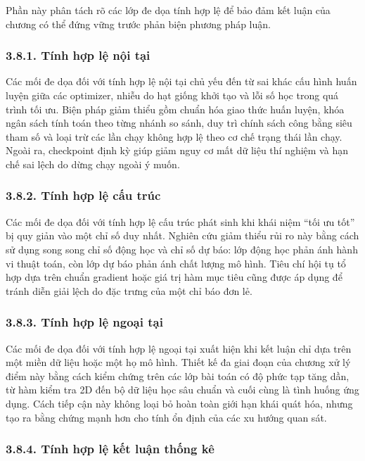 \documentclass[a4paper,12pt]{article}
\begin{document}
Phần này phân tách rõ các lớp đe dọa tính hợp lệ để bảo đảm kết luận của chương có thể đứng vững trước phản biện phương pháp luận.

\subsubsection{3.8.1. Tính hợp lệ nội tại}

Các mối đe dọa đối với tính hợp lệ nội tại chủ yếu đến từ sai khác cấu hình huấn luyện giữa các optimizer, nhiễu do hạt giống khởi tạo và lỗi số học trong quá trình tối ưu. Biện pháp giảm thiểu gồm chuẩn hóa giao thức huấn luyện, khóa ngân sách tính toán theo từng nhánh so sánh, duy trì chính sách công bằng siêu tham số và loại trừ các lần chạy không hợp lệ theo cơ chế trạng thái lần chạy. Ngoài ra, checkpoint định kỳ giúp giảm nguy cơ mất dữ liệu thí nghiệm và hạn chế sai lệch do dừng chạy ngoài ý muốn.

\subsubsection{3.8.2. Tính hợp lệ cấu trúc}

Các mối đe dọa đối với tính hợp lệ cấu trúc phát sinh khi khái niệm “tối ưu tốt” bị quy giản vào một chỉ số duy nhất. Nghiên cứu giảm thiểu rủi ro này bằng cách sử dụng song song chỉ số động học và chỉ số dự báo: lớp động học phản ánh hành vi thuật toán, còn lớp dự báo phản ánh chất lượng mô hình. Tiêu chí hội tụ tổ hợp dựa trên chuẩn gradient hoặc giá trị hàm mục tiêu cũng được áp dụng để tránh diễn giải lệch do đặc trưng của một chỉ báo đơn lẻ.

\subsubsection{3.8.3. Tính hợp lệ ngoại tại}

Các mối đe dọa đối với tính hợp lệ ngoại tại xuất hiện khi kết luận chỉ dựa trên một miền dữ liệu hoặc một họ mô hình. Thiết kế đa giai đoạn của chương xử lý điểm này bằng cách kiểm chứng trên các lớp bài toán có độ phức tạp tăng dần, từ hàm kiểm tra 2D đến bộ dữ liệu học sâu chuẩn và cuối cùng là tình huống ứng dụng. Cách tiếp cận này không loại bỏ hoàn toàn giới hạn khái quát hóa, nhưng tạo ra bằng chứng mạnh hơn cho tính ổn định của các xu hướng quan sát.

\subsubsection{3.8.4. Tính hợp lệ kết luận thống kê}
\end{document}
